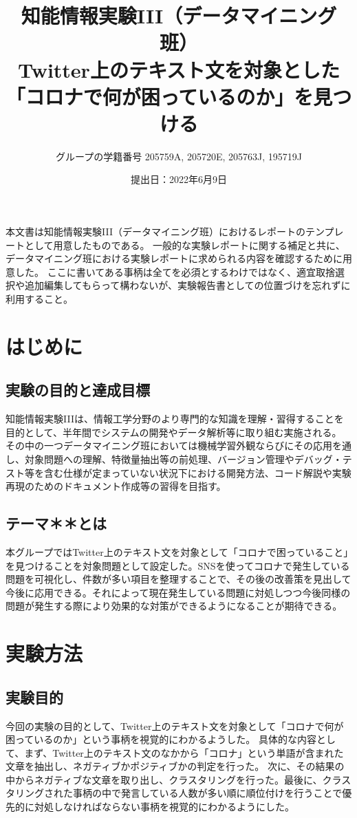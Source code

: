 \documentclass[a4paper, 11pt, titlepage]{jsarticle}
\title{知能情報実験III（データマイニング班）\\Twitter上のテキスト文を対象とした「コロナで何が困っているのか」を見つける}
\author{グループの学籍番号 205759A, 205720E, 205763J, 195719J}
\date{提出日：2022年6月9日}
\begin{document}
\maketitle
\tableofcontents
\clearpage

本文書は知能情報実験III（データマイニング班）におけるレポートのテンプレートとして用意したものである。
一般的な実験レポートに関する補足と共に、データマイニング班における実験レポートに求められる内容を確認するために用意した。
ここに書いてある事柄は全てを必須とするわけではなく、適宜取捨選択や追加編集してもらって構わないが、実験報告書としての位置づけを忘れずに利用すること。

\section{はじめに}
\subsection{実験の目的と達成目標}
知能情報実験IIIは、情報工学分野のより専門的な知識を理解・習得することを目的として、半年間でシステムの開発やデータ解析等に取り組む実施される。
その中の一つデータマイニング班においては機械学習外観ならびにその応用を通し、対象問題への理解、特徴量抽出等の前処理、バージョン管理やデバッグ・テスト等を含む仕様が定まっていない状況下における開発方法、コード解説や実験再現のためのドキュメント作成等の習得を目指す。

\subsection{テーマ＊＊とは}
本グループではTwitter上のテキスト文を対象として「コロナで困っていること」を見つけることを対象問題として設定した。SNSを使ってコロナで発生している問題を可視化し、件数が多い項目を整理することで、その後の改善策を見出して今後に応用できる。それによって現在発生している問題に対処しつつ今後同様の問題が発生する際により効果的な対策ができるようになることが期待できる。

\section{実験方法}
\subsection{実験目的}
今回の実験の目的として、Twitter上のテキスト文を対象として「コロナで何が困っているのか」という事柄を視覚的にわかるようした。
具体的な内容として、まず、Twitter上のテキスト文のなかから「コロナ」という単語が含まれた文章を抽出し、ネガティブかポジティブかの判定を行った。
次に、その結果の中からネガティブな文章を取り出し、クラスタリングを行った。最後に、クラスタリングされた事柄の中で発言している人数が多い順に順位付けを行うことで優先的に対処しなければならない事柄を視覚的にわかるようにした。
\end{document}
